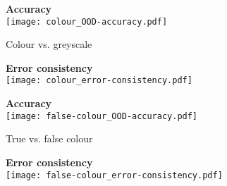 \begin{figure}
	\begin{subfigure}{\figwidth}
			\centering
			\textbf{Accuracy}\\
			\texttt{[image: colour\_OOD-accuracy.pdf]}
			\vspace{\captionspace}
			\caption{Colour vs. greyscale}
			\vspace{\captionspaceII}
		\end{subfigure}\hfill
		\begin{subfigure}{\figwidth}
			\centering
			\textbf{Error consistency}\\
			\texttt{[image: colour\_error-consistency.pdf]}
			\vspace{\captionspace}
			\caption*{}
			\vspace{\captionspaceII}
		\end{subfigure}\hfill
		\begin{subfigure}{\figwidth}
			\centering
			\textbf{Accuracy}\\
			\texttt{[image: false-colour\_OOD-accuracy.pdf]}
			\vspace{\captionspace}
			\caption{True vs. false colour}
			\vspace{\captionspaceII}
		\end{subfigure}\hfill
		\begin{subfigure}{\figwidth}
			\centering
			\textbf{Error consistency}\\
			\texttt{[image: false-colour\_error-consistency.pdf]}
			\vspace{\captionspace}
			\caption*{}
			\vspace{\captionspaceII}
		\end{subfigure}\hfill
	

\end{figure}
